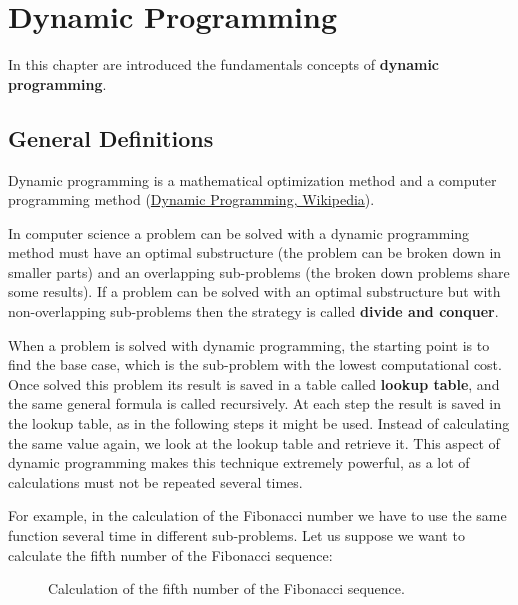 \chapter{Dynamic Programming}
\label{chp:dynamicprogramming}
In this chapter are introduced the fundamentals concepts of \textbf{dynamic programming}.
 
\section{General Definitions}
Dynamic programming is a mathematical optimization method and a computer programming method \cite{wikidynamicprogramming} (\href{https://en.wikipedia.org/wiki/Dynamic_programming}{Dynamic Programming, Wikipedia}).

In computer science a problem can be solved with a dynamic programming method must have an optimal substructure (the problem can be broken down in smaller parts) and an overlapping sub-problems (the broken down problems share some results). If a problem can be solved with an optimal substructure but with non-overlapping sub-problems then the strategy is called \textbf{divide and conquer}.

When a problem is solved with dynamic programming, the starting point is to find the base case, which is the sub-problem with the lowest computational cost. Once solved this problem its result is saved in a table called \textbf{lookup table}, and the same general formula is called recursively. At each step the result is saved in the lookup table, as in the following steps it might be used. Instead of calculating the same value again, we look at the lookup table and retrieve it. This aspect of dynamic programming makes this technique extremely powerful, as a lot of calculations must not be repeated several times.

For example, in the calculation of the Fibonacci number we have to use the same function several time in different sub-problems. Let us suppose we want to calculate the fifth number of the Fibonacci sequence:

\begin{figure}[H]
\centering
{}
\caption[Calculation of the fifth number of the Fibonacci sequence.]{Calculation of the fifth number of the Fibonacci sequence.}
\end{figure}

